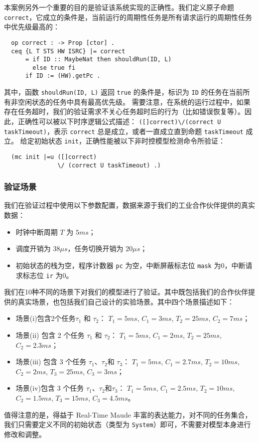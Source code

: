 本案例另外一个重要的目的是验证该系统实现的正确性。我们定义原子命题
 \verb|correct|，它成立的条件是，当前运行的周期性任务是所有请求运行的周期性任务中优先级最高的：
\begin{verbatim}
  op correct : -> Prop [ctor] .
  ceq {L T STS HW ISRC} |= correct
      = if ID :: MaybeNat then shouldRun(ID, L)
        else true fi
      if ID := (HW).getPc .
\end{verbatim}
其中，函数 \verb|shouldRun(ID, L)| 返回 \verb|true| 的条件是，标识为 \verb|ID| 的任务在当前所有非空闲状态的任务中具有最高优先级。
需要注意，在系统的运行过程中，如果存在任务超时，我们的验证需求不关心任务超时后的行为（比如错误恢复等）。因此，正确性可以被以下时序逻辑公式描述：
\verb|([]correct)\/(correct U taskTimeout)|，表示 \verb|correct| 总是成立，或者一直成立直到命题 \verb|taskTimeout| 成立。
给定初始状态 \verb|init|，正确性能被以下非时控模型检测命令所验证：
\begin{verbatim} 
  (mc init |=u ([]correct) 
               \/ (correct U taskTimeout) .)
\end{verbatim}

\subsubsection{验证场景}
\label{ss:results} 
我们在验证过程中使用以下参数配置，数据来源于我们的工业合作伙伴提供的真实数据：
\begin{itemize}
\item 时钟中断周期 $T$ 为 $5ms$；
\item 调度开销为 $38{\mu}s$，任务切换开销为 $20{\mu}s$；
\item 初始状态的栈为空，程序计数器 \verb|pc| 为空，中断屏蔽标志位 \verb|mask| 为0，中断请求标志位 \verb|ir| 为0。
\end{itemize}

我们在10种不同的场景下对我们的模型进行了验证。其中既包括我们的合作伙伴提供的真实场景，也包括我们自己设计的实验场景。其中四个场景描述如下：
\begin{itemize}
\item 场景(i)包含2个任务$\tau_1$ 和 $\tau_2$： $T_1=5ms$,
  $C_1=3ms$, $T_2=25ms$, $C_2=7ms$；
\item 场景(ii) 包含 2 个任务 $\tau_1$ 和 $\tau_2$： $T_1=5ms$,
  $C_1=2ms$, $T_2=25ms$, $C_2=2.3ms$；
\item 场景(iii) 包含 3 个任务 $\tau_1$、$\tau_2$和 $\tau_3$：
  $T_1=5ms$, $C_1=2.7ms$, $T_2=10ms$, $C_2=2ms$, $T_3=25ms$,
  $C_3=3ms$；
\item 场景(iv)包含 3 个任务 $\tau_1$、$\tau_2$和$\tau_3$：
  $T_1=5ms$, $C_1=2.5ms$, $T_2=10ms$, $C_2=1.5ms$,
  $T_3=15ms$, $C_3=4.5ms$。
\end{itemize}
值得注意的是，得益于 Real-Time Maude 丰富的表达能力，对不同的任务集合，我们只需要定义不同的初始状态（类型为 \verb|System|）即可，不需要对模型本身进行修改和调整。


